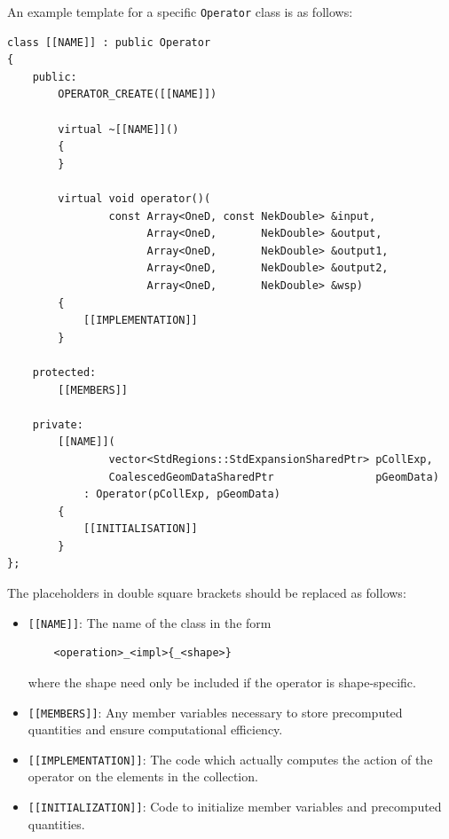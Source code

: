 An example template for a specific \texttt{Operator} class is as follows:
\begin{lstlisting}[style=C++Style]
class [[NAME]] : public Operator
{
    public:
        OPERATOR_CREATE([[NAME]])

        virtual ~[[NAME]]()
        {
        }

        virtual void operator()(
                const Array<OneD, const NekDouble> &input,
                      Array<OneD,       NekDouble> &output,
                      Array<OneD,       NekDouble> &output1,
                      Array<OneD,       NekDouble> &output2,
                      Array<OneD,       NekDouble> &wsp)
        {
            [[IMPLEMENTATION]]
        }

    protected:
        [[MEMBERS]]

    private:
        [[NAME]](
                vector<StdRegions::StdExpansionSharedPtr> pCollExp,
                CoalescedGeomDataSharedPtr                pGeomData)
            : Operator(pCollExp, pGeomData)
        {
            [[INITIALISATION]]
        }
};
\end{lstlisting}
The placeholders in double square brackets should be replaced as follows:
\begin{itemize}
	\item \texttt{[[NAME]]}: The name of the class in the form
	\begin{lstlisting}
	<operation>_<impl>{_<shape>}
	\end{lstlisting}
	where the shape need only be included if the operator is shape-specific.
	\item \texttt{[[MEMBERS]]}: Any member variables necessary to store precomputed
	quantities and ensure computational efficiency.
    \item \texttt{[[IMPLEMENTATION]]}: The code which actually computes the action
    of the operator on the elements in the collection.
	\item \texttt{[[INITIALIZATION]]}: Code to initialize member variables and
	precomputed quantities.
\end{itemize}

